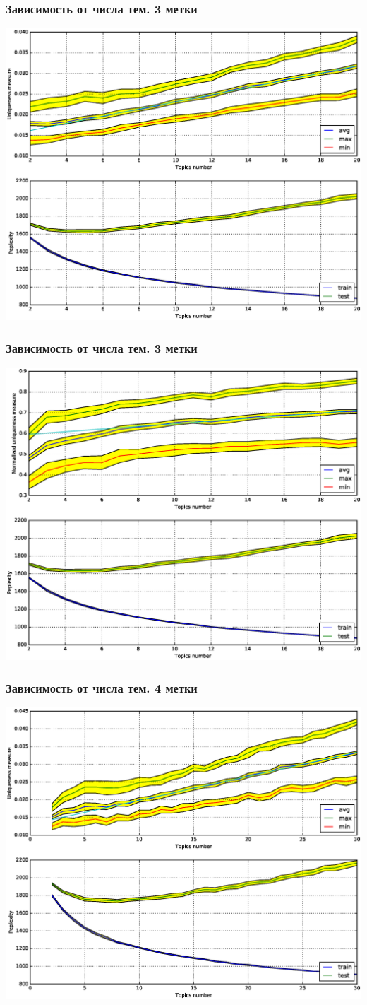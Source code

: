 \documentclass[utf8]{beamer}
\begin{document}
	\begin{frame}	
	\frametitle{Зависимость от числа тем. 3 метки}
	\includegraphics[width=0.75\linewidth]{presentation_pictures/topics_dependency_origin_3_ums.eps} 
	\end{frame}
	
	
	\begin{frame}	
	\frametitle{Зависимость от числа тем. 3 метки}
	\includegraphics[width=0.75\linewidth]{presentation_pictures/topics_dependency_origin_3_nums.eps} 
	\end{frame}
	
	
	\begin{frame}	
	\frametitle{Зависимость от числа тем. 4 метки}
	\includegraphics[width=0.75\linewidth]{presentation_pictures/topics_dependency_origin_4_ums.eps} 
	\end{frame}
\end{document}
